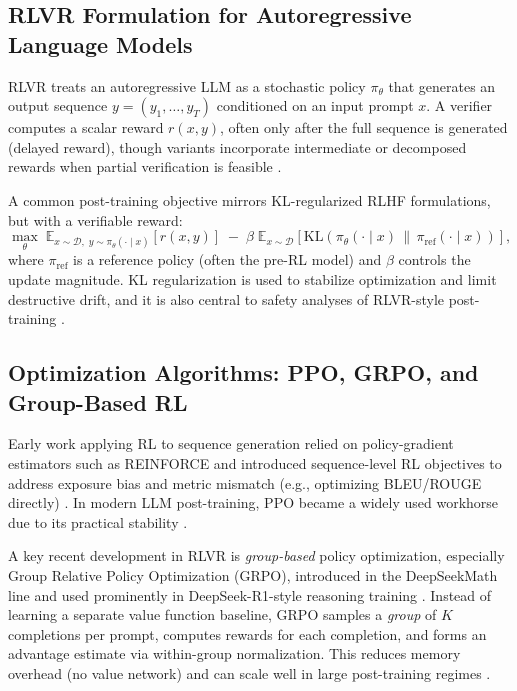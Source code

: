 \documentclass[sigconf]{acmart}
\begin{document}
\subsection{RLVR Formulation for Autoregressive Language Models}

RLVR treats an autoregressive LLM as a stochastic policy $\pi_\theta$ that generates an output sequence $y = (y_1,\dots,y_T)$ conditioned on an input prompt $x$.
A verifier computes a scalar reward $r(x,y)$, often only after the full sequence is generated (delayed reward), though variants incorporate intermediate or decomposed rewards when partial verification is feasible \cite{wang2026verpo}.

A common post-training objective mirrors KL-regularized RLHF formulations, but with a verifiable reward:
\begin{equation}
\label{eq:rlvr_objective}
\max_{\theta}\;
\mathbb{E}_{x \sim \mathcal{D},\; y \sim \pi_\theta(\cdot \mid x)}
\left[r(x,y)\right]
\;-\;
\beta\;\mathbb{E}_{x \sim \mathcal{D}}
\left[\mathrm{KL}\!\left(\pi_\theta(\cdot\mid x)\,\|\,\pi_{\mathrm{ref}}(\cdot\mid x)\right)\right],
\end{equation}
where $\pi_{\mathrm{ref}}$ is a reference policy (often the pre-RL model) and $\beta$ controls the update magnitude.
KL regularization is used to stabilize optimization and limit destructive drift, and it is also central to safety analyses of RLVR-style post-training \cite{cho2025safetycapability}.

\subsection{Optimization Algorithms: PPO, GRPO, and Group-Based RL}

Early work applying RL to sequence generation relied on policy-gradient estimators such as REINFORCE \cite{williams1992reinforce} and introduced sequence-level RL objectives to address exposure bias and metric mismatch (e.g., optimizing BLEU/ROUGE directly) \cite{ranzato2016sequence,paulus2018summarization}.
In modern LLM post-training, PPO became a widely used workhorse due to its practical stability \cite{schulman2017ppo,ouyang2022instructgpt}.

A key recent development in RLVR is \emph{group-based} policy optimization, especially Group Relative Policy Optimization (GRPO), introduced in the DeepSeekMath line and used prominently in DeepSeek-R1-style reasoning training \cite{deepseekai2024deepseekmath,guo2025deepseekr1}.
Instead of learning a separate value function baseline, GRPO samples a \emph{group} of $K$ completions per prompt, computes rewards for each completion, and forms an advantage estimate via within-group normalization.
This reduces memory overhead (no value network) and can scale well in large post-training regimes \cite{deepseekai2024deepseekmath,mroueh2025grpo}.
\end{document}

